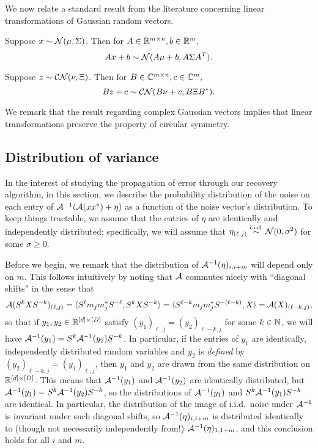 We now relate a standard result from the literature concerning linear transformations of Gaussian random vectors.
\begin{proposition}  
  Suppose $x \sim \mathcal{N}(\mu, \Sigma)$.  Then for $A \in \mathbb{R}^{m \times n}, b \in \mathbb{R}^m,$ \begin{equation} Ax + b \sim \mathcal{N}(A \mu + b, A \Sigma A^T). \label{eq:real_gausaff} \end{equation}

  Suppose $z \sim \mathcal{C N}(\nu, \Xi)$.  Then for $B \in \mathbb{C}^{m \times n}, c \in \mathbb{C}^m,$ \begin{equation} B z + c \sim \mathcal{C N}(B \nu + c, B \Xi B^*). \label{eq:cpx_gausaff}\end{equation}
  \label{prop:gausaff}
\end{proposition}
We remark that the result regarding complex Gaussian vectors implies that linear transformations preserve the property of circular symmetry.

\subsection{Distribution of variance}
\label{sec:dist_var}
In the interest of studying the propagation of error through our recovery algorithm, in this section, we describe the probability distribution of the noise on each entry of $\mathcal{A}^{-1}(\mathcal{A}(x x^*) + \eta)$ as a function of the noise vector's distribution.  To keep things tractable, we assume that the entries of $\eta$ are identically and independently distributed; specifically, we will assume that $\eta_{(\ell, j)} \overset{\text{i.i.d.}}{\sim} \mathcal{N}(0, \sigma^2)$ for some $\sigma \ge 0$.

Before we begin, we remark that the distribution of $\mathcal{A}^{-1}(\eta)_{i, i + m}$ will depend only on $m$.  This follows intuitively by noting that $\mathcal{A}$ commutes nicely with ``diagonal shifts'' in the sense that \[\mathcal{A}(S^k X S^{-k})_{(\ell, j)} = \langle S^{\ell} m_j m_j^* S^{-\ell}, S^k X S^{-k}\rangle = \langle S^{\ell - k} m_j m_j^* S^{-(\ell - k)}, X\rangle = \mathcal{A}(X)_{(\ell - k, j)},\] so that if $y_1, y_2 \in \mathbb{R}^{[d] \times [D]}$ satisfy $(y_1)_{\ell, j} = (y_2)_{\ell - k, j}$ for some $k \in \mathbb{N}$, we will have $\mathcal{A}^{-1}(y_1) = S^k \mathcal{A}^{-1}(y_2) S^{-k}$.  In particular, if the entries of $y_1$ are identically, independently distributed random variables and $y_2$ is \emph{defined} by $(y_2)_{\ell - k, j} = (y_1)_{\ell, j}$, then $y_1$ and $y_2$ are drawn from the same distribution on $\mathbb{R}^{[d] \times [D]}$.  This means that $\mathcal{A}^{-1}(y_1)$ and $\mathcal{A}^{-1}(y_2)$ are identically distributed, but $\mathcal{A}^{-1}(y_1) = S^k \mathcal{A}^{-1}(y_2) S^{-k}$, so the distributions of $\mathcal{A}^{-1}(y_1)$ and $S^k \mathcal{A}^{-1}(y_1) S^{-k}$ are identical.  In particular, the distribution of the image of i.i.d.~noise under $\mathcal{A}^{-1}$ is invariant under such diagonal shifts, so $\mathcal{A}^{-1}(\eta)_{i, i + m}$ is distributed identically to (though not necessarily independently from!) $\mathcal{A}^{-1}(\eta)_{1, 1 + m}$, and this conclusion holds for all $i$ and $m$.


